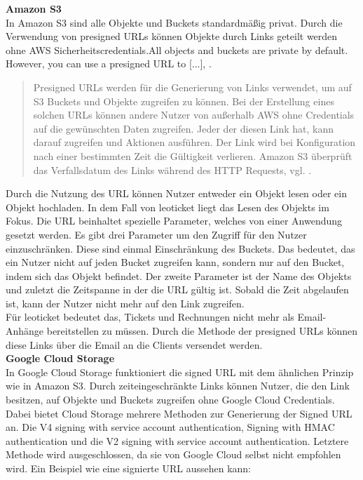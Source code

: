 \textbf{Amazon S3}\\

In Amazon S3 sind alle Objekte und Buckets standardmäßig privat. Durch die Verwendung von presigned URLs können Objekte durch Links geteilt werden ohne AWS Sicherheitscredentials.\glqq All objects and buckets are private by default. However, you can use a presigned URL to [...]\grqq, \cite{aws-signed-urls}. 

\begin{quote}
	Presigned URLs werden für die Generierung von Links verwendet, um auf S3 Buckets und Objekte zugreifen zu können. Bei der Erstellung eines solchen URLs können andere Nutzer von außerhalb AWS ohne Credentials auf die gewünschten Daten zugreifen. Jeder der diesen Link hat, kann darauf zugreifen und Aktionen ausführen. Der Link wird bei Konfiguration nach einer bestimmten Zeit die Gültigkeit verlieren. Amazon S3 überprüft das Verfallsdatum des Links während des HTTP Requests, vgl. \cite{aws-signed-urls}. 
\end{quote}

Durch die Nutzung des URL können Nutzer entweder ein Objekt lesen oder ein Objekt hochladen. In dem Fall von leoticket liegt das Lesen des Objekts im Fokus. Die URL beinhaltet spezielle Parameter, welches von einer Anwendung gesetzt werden. Es gibt drei Parameter um den Zugriff für den Nutzer einzuschränken. Diese sind einmal Einschränkung des Buckets. Das bedeutet, das ein Nutzer nicht auf jeden Bucket zugreifen kann, sondern nur auf den Bucket, indem sich das Objekt befindet. Der zweite Parameter ist der Name des Objekts und zuletzt die Zeitspanne in der die URL gültig ist. Sobald die Zeit abgelaufen ist, kann der Nutzer nicht mehr auf den Link zugreifen.\\

Für leoticket bedeutet das, Tickets und Rechnungen nicht mehr als Email-Anhänge bereitstellen zu müssen. Durch die Methode der presigned URLs können diese Links über die Email an die Clients versendet werden.\\

\textbf{Google Cloud Storage}\\

In Google Cloud Storage funktioniert die signed URL mit dem ähnlichen Prinzip wie in Amazon S3. Durch zeiteingeschränkte Links können Nutzer, die den Link besitzen, auf Objekte und Buckets zugreifen ohne Google Cloud Credentials. Dabei bietet Cloud Storage mehrere Methoden zur Generierung der Signed URL an. Die V4 signing with service account authentication, Signing with HMAC authentication und die V2 signing with service account authentication. Letztere Methode wird ausgeschlossen, da sie von Google Cloud selbst nicht empfohlen wird. Ein Beispiel wie eine signierte URL aussehen kann:

